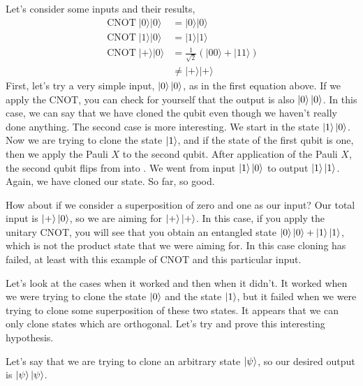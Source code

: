 Let's consider some inputs and their results,
\begin{equation}
\begin{aligned}
\operatorname{CNOT} |0\rangle|0\rangle &=|0\rangle|0\rangle \\
\operatorname{CNOT} |1\rangle|0\rangle &=|1\rangle|1\rangle \\
\operatorname{CNOT} |+\rangle|0\rangle &=\frac{1}{\sqrt{2}}(|00\rangle+|11\rangle) \\
& \neq|+\rangle|+\rangle
\end{aligned}
\end{equation}
First, let's try a very simple input, $\left| 0 \right\rangle\left| 0 \right\rangle$, as in the first equation above. If we apply the CNOT, you can check for yourself that the output is also $\left| 0 \right\rangle\left| 0 \right\rangle$. In this case, we can say that we have cloned the qubit even though we haven't really done anything. The second case is more interesting. We start in the state $\left| 1 \right\rangle\left| 0 \right\rangle$. Now we are trying to clone the state $\left| 1 \right\rangle$, and if the state of the first qubit is one, then we apply the Pauli $X$ to the second qubit. After application of the Pauli $X$, the second qubit flips from  into . We went from input $\left| 1 \right\rangle\left| 0 \right\rangle$ to output $\left| 1 \right\rangle\left| 1 \right\rangle$. Again, we have cloned our state. So far, so good.

How about if we consider a superposition of zero and one as our input? Our total input is $\left| + \right\rangle\left| 0 \right\rangle$, so we are aiming for $\left| + \right\rangle\left| + \right\rangle$. In this case, if you apply the unitary CNOT, you will see that you obtain an entangled state $\left| 0 \right\rangle\left| 0 \right\rangle+\left| 1 \right\rangle\left| 1 \right\rangle$, which is not the product state that we were aiming for. In this case cloning has failed, at least with this example of CNOT and this particular input.

Let's look at the cases when it worked and then when it didn't. It worked when we were trying to clone the state $\left| 0 \right\rangle$ and the state $\left| 1 \right\rangle$, but it failed when we were trying to clone some superposition of these two states. It appears that we can only clone states which are orthogonal. Let's try and prove this interesting hypothesis.

Let's say that we are trying to clone an arbitrary state $\left| \psi \right\rangle$, so our desired output is $\left| \psi \right\rangle\left| \psi \right\rangle$.

